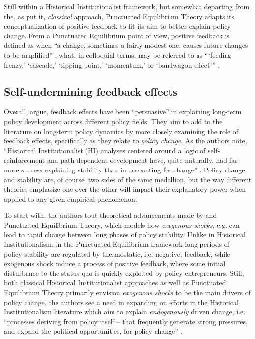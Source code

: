 \documentclass[11pt]{article}
\begin{document}
Still within a Historical Institutionalist framework, but somewhat departing from the, as \textcite{Jacobs2014} put it, \textit{classical} approach, Punctuated Equilibrium Theory \parencites{Baumgartner2009}{Baumgartner2002} adapts its conceptualization of positive feedback to fit its aim to better explain policy change. From a Punctuated Equilibrium point of view, positive feedback is defined as when \enquote{a change, sometimes a fairly modest one, causes future changes to be amplified} \parencite[p. 61]{Baumgartner2018}, what, in colloquial terms, may be referred to as \enquote{\enquote{feeding frenzy,} \enquote{cascade,} \enquote{tipping point,} \enquote{momentum,} or \enquote{bandwagon effect}} .

\subsection*{Self-undermining feedback effects}
Overall, \textcite[][]{Jacobs2014} argue, feedback effects have been \enquote{persuasive}  in explaining long-term policy development across different policy fields. They aim to add to the literature on long-term policy dynamics by more closely examining the role of feedback effects, specifically as they relate to \textit{policy change}. As the authors note, \enquote{Historical Institutionalist (HI) analyses centered around a logic of self-reinforcement and path-dependent development have, quite naturally, had far more success explaining stability than in accounting for change} \parencite[][p. 443]{Jacobs2014}. Policy change and stability are, of course, two sides of the same medallion, but the way different theories emphasize one over the other will impact their explanatory power when applied to any given empirical phenomenon.

To start with, the authors tout theoretical advancements made by \textcite[][]{Baumgartner2002} and Punctuated Equilibrium Theory, which models how \textit{exogenous shocks}, e.g. can lead to rapid change between long phases of policy stability. Unlike in Historical Institutionalism, in the Punctuated Equilibrium framework long periods of policy-stability are regulated by thermostatic, i.e. negative, feedback, while exogenous shock induce a process of positive feedback, where some initial disturbance to the status-quo is quickly exploited by policy entrepreneurs. Still, both classical Historical Institutionalist approaches as well as Punctuated Equilibrium Theory primarily envision \textit{exogenous shocks} to be the main drivers of policy change, the authors see a need in expanding on efforts in the Historical Institutionalism literature which aim to explain \textit{endogenously} driven change, i.e. \enquote{processes deriving from policy itself -- that frequently generate strong pressures, and expand the political opportunities, for policy change} \parencite[p. 442]{Jacobs2014}.
\end{document}
